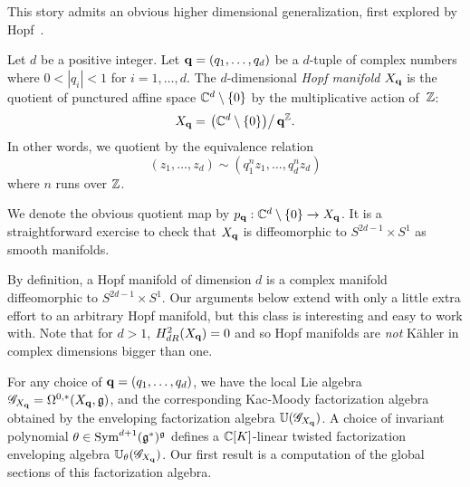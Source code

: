 This story admits an obvious higher dimensional generalization, first explored by Hopf~\cite{Hopf}.

\begin{dfn}
Let $d$ be a positive integer.
Let ${\bf q} = (q_1,\ldots, q_d)$ be a $d$-tuple of complex numbers where $0 < |q_i| < 1$ for $i = 1, \ldots, d$. 
The $d$-dimensional {\em Hopf manifold} $X_{\bf q}$ is the quotient of punctured affine space $\mathbb C^d \setminus \{0\}$ by the multiplicative action of~$\mathbb Z$:
\[
X_{\bf q} = \left. \left(\mathbb C^d \setminus \{0\}\right) \right/ {\bf q}^\mathbb Z.  
\]
In other words, we quotient by the equivalence relation
\[
(z_1,\ldots,z_d) \sim (q_1^{n} z_1, \ldots,q_d^{n} z_d)
\]
where $n$ runs over $\mathbb Z$.
\end{dfn}


We denote the obvious quotient map by $p_{\bf q} : \mathbb C^d \setminus \{0\} \to X_{\bf q}$. 
It is a straightforward exercise to check that $X_{\bf q}$ is diffeomorphic to $S^{2d-1} \times S^1$ as smooth manifolds.

\begin{rmk}
By definition, a Hopf manifold of dimension $d$ is a complex manifold diffeomorphic to $S^{2d-1} \times S^1$. 
Our arguments below extend with only a little extra effort to an arbitrary Hopf manifold, 
but this class is interesting and easy to work with.
Note that for $d>1$, $H^{2}_{dR} (X_{\bf q}) = 0$ and so Hopf manifolds are {\em not} K\"{a}hler in complex dimensions bigger than one. 
\end{rmk}


For any choice of ${\bf q} = (q_1,\ldots,q_d)$, we have the local Lie algebra $\mathscr G_{X_{\bf q}} = \Omega^{0,*}(X_{\bf q}, \mathfrak g)$, and the corresponding Kac-Moody factorization algebra obtained by the enveloping factorization algebra $\mathbb U(\mathscr G_{X_{\bf q}})$.
A choice of invariant polynomial $\theta \in {\rm Sym}^{d+1}(\mathfrak g^*)^\mathfrak g$ defines a $\mathbb C[K]$-linear twisted factorization enveloping algebra $\mathbb U_{\theta}(\mathscr G_{X_{\bf q}})$.  
Our first result is a computation of the global sections of this factorization algebra.  


